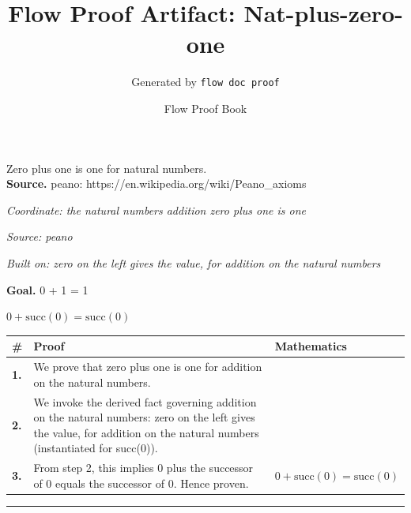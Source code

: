 \documentclass[11pt]{article}
\title{Flow Proof Artifact: Nat-plus-zero-one}
\author{Generated by \texttt{flow doc proof}}
\date{Flow Proof Book}
\theoremstyle{definition}
\begin{document}
\maketitle
Zero plus one is one for natural numbers.\\[0.5em]
\textbf{Source.} peano: https://en.wikipedia.org/wiki/Peano\_axioms\\[0.5em]
\bigskip
{}\par
\smallskip\noindent\textit{Coordinate: the natural numbers \cdot addition \cdot zero plus one is one}\par
\smallskip\noindent\textit{Source: peano}\par
\smallskip\noindent\textit{Built on: zero on the left gives the value, for addition on the natural numbers}\par
\medskip
\noindent\textbf{Goal.} 0 + 1 = 1\par
\noindent$\displaystyle 0 + \mathrm{succ}(0) = \mathrm{succ}(0)$\par
\medskip
\noindent
\begin{tabular}{@{} >{\raggedright\arraybackslash}p{} >{\raggedright\arraybackslash}p{} >{\raggedleft\arraybackslash}p{} @{}}
\textbf{\#} & \textbf{Proof} & \textbf{Mathematics} \\
\midrule
\textbf{1.} & We prove that zero plus one is one for addition on the natural numbers. & \\[0.45em]
\textbf{2.} & We invoke the derived fact governing addition on the natural numbers: zero on the left gives the value, for addition on the natural numbers (instantiated for succ(0)). & \\[0.45em]
\textbf{3.} & From step 2, this implies 0 plus the successor of 0 equals the successor of 0. Hence proven. & $\displaystyle 0 + \mathrm{succ}(0) = \mathrm{succ}(0)$ \\[0.45em]
\bottomrule
\end{tabular}
\label{thm:Nat-addition-zero_plus_one_is_one}
\par\medskip\hrule
\end{document}
